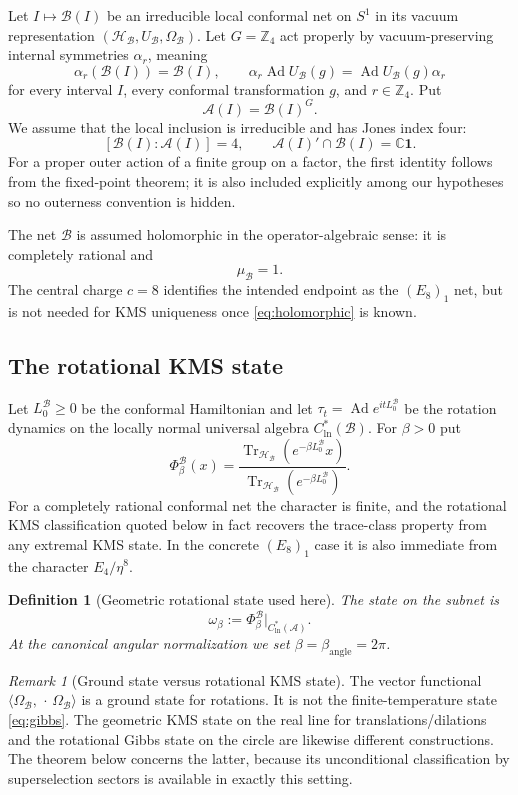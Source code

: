 \documentclass[11pt]{article}
\newtheorem{definition}[theorem]{Definition}
\theoremstyle{remark}
\newtheorem{remark}[theorem]{Remark}
\newcommand{\A}{\mathcal A}
\newcommand{\B}{\mathcal B}
\newcommand{\Hh}{\mathcal H}
\newcommand{\C}{\mathbb C}
\newcommand{\Z}{\mathbb Z}
\newcommand{\id}{\mathbf 1}
\newcommand{\Tr}{\operatorname{Tr}}
\newcommand{\Ad}{\operatorname{Ad}}
\begin{document}
Let $I\mapsto\B(I)$ be an irreducible local conformal net on $S^1$ in
its vacuum representation $(\Hh_{\B},U_{\B},\Omega_{\B})$.  Let
$G=\Z_4$ act properly by vacuum-preserving internal symmetries
$\alpha_r$, meaning
\[
 \alpha_r(\B(I))=\B(I),\qquad
 \alpha_r\Ad U_{\B}(g)=\Ad U_{\B}(g)\alpha_r
\]
for every interval $I$, every conformal transformation $g$, and
$r\in\Z_4$.  Put
\[
 \A(I)=\B(I)^G.
\]
We assume that the local inclusion is irreducible and has Jones index
four:
\[
 [\B(I):\A(I)]=4,\qquad
 \A(I)'\cap\B(I)=\C\id.
\tag{1.1}\label{eq:local-inclusion}
\]
For a proper outer action of a finite group on a factor, the first
identity follows from the fixed-point theorem; it is also included
explicitly among our hypotheses so no outerness convention is hidden.

The net $\B$ is assumed holomorphic in the operator-algebraic sense:
it is completely rational and
\[
 \mu_{\B}=1.
\tag{1.2}\label{eq:holomorphic}
\]
The central charge $c=8$ identifies the intended endpoint as the
$(E_8)_1$ net, but is not needed for KMS uniqueness once
\eqref{eq:holomorphic} is known.

\subsection{The rotational KMS state}

Let $L_0^{\B}\geq0$ be the conformal Hamiltonian and let
$\tau_t=\Ad e^{itL_0^{\B}}$ be the rotation dynamics on the locally
normal universal algebra $C^*_{\mathrm{ln}}(\B)$.  For $\beta>0$ put
\[
 \Phi_\beta^{\B}(x)
 =\frac{\Tr_{\Hh_{\B}}(e^{-\beta L_0^{\B}}x)}
 {\Tr_{\Hh_{\B}}(e^{-\beta L_0^{\B}})}.
\tag{1.3}\label{eq:gibbs}
\]
For a completely rational conformal net the character is finite, and
the rotational KMS classification quoted below in fact recovers the
trace-class property from any extremal KMS state.  In the concrete
$(E_8)_1$ case it is also immediate from the character
$E_4/\eta^8$.

\begin{definition}[Geometric rotational state used here]
\label{def:geometric}
The state on the subnet is
\[
 \omega_\beta:=\Phi_\beta^{\B}|_{C^*_{\mathrm{ln}}(\A)}.
\tag{1.4}\label{eq:omega-def}
\]
At the canonical angular normalization we set
$\beta=\beta_{\mathrm{angle}}=2\pi$.
\end{definition}

\begin{remark}[Ground state versus rotational KMS state]
The vector functional
$\langle\Omega_{\B},\,\cdot\,\Omega_{\B}\rangle$ is a ground state for
rotations.  It is not the finite-temperature state
\eqref{eq:gibbs}.  The geometric KMS state on the real line for
translations/dilations and the rotational Gibbs state on the circle
are likewise different constructions.  The theorem below concerns
the latter, because its unconditional classification by
superselection sectors is available in exactly this setting.
\end{remark}
\end{document}
